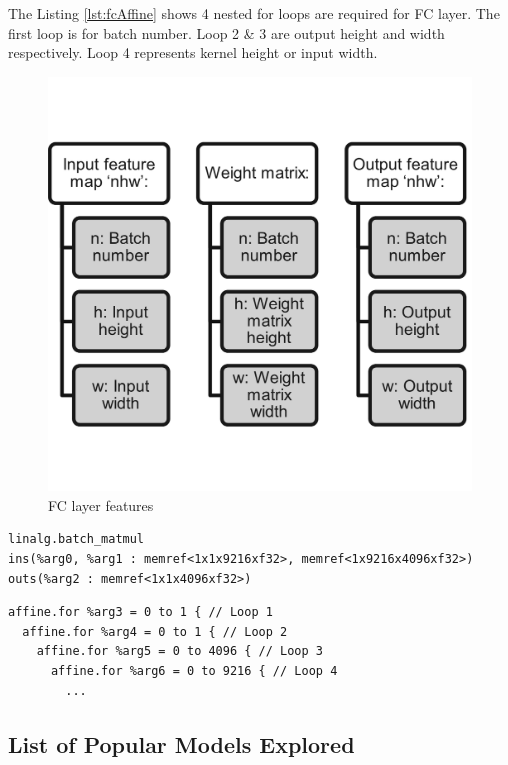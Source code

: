 The Listing \ref{lst:fcAffine} shows 4 nested for loops are required for FC layer. The first loop is for batch number. Loop 2 \& 3 are output height and width respectively.  Loop 4 represents kernel height or input width.

\begin{figure}[H]
    \centering
    \includegraphics[width=0.5\linewidth]{figure//chapter3_implementation/Figure 4 - fc features.png}
    \caption{FC layer features}
    \label{fig:fcFeatures}
\end{figure}


\begin{lstlisting}[caption={Example depth-wise conv2d at Linalg dialect}, label={lst:fcLinalg}]
linalg.batch_matmul 
ins(%arg0, %arg1 : memref<1x1x9216xf32>, memref<1x9216x4096xf32>) 
outs(%arg2 : memref<1x1x4096xf32>)
\end{lstlisting}

\begin{lstlisting}[caption={Example depth-wise conv2d at Affine dialect}, label={lst:fcAffine}]
affine.for %arg3 = 0 to 1 { // Loop 1
  affine.for %arg4 = 0 to 1 { // Loop 2
    affine.for %arg5 = 0 to 4096 { // Loop 3
      affine.for %arg6 = 0 to 9216 { // Loop 4
        ...
\end{lstlisting}

\clearpage
\subsection{List of Popular Models Explored}

